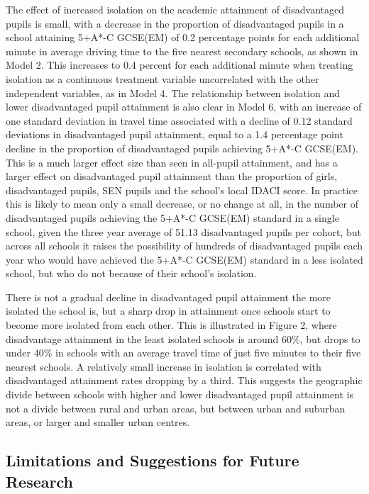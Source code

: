 \documentclass[12pt, a4paper]{article}
\begin{document}
The effect of increased isolation on the academic attainment of disadvantaged pupils is small, with a decrease in the proportion of disadvantaged pupils in a school attaining 5+A*-C GCSE(EM) of 0.2 percentage points for each additional minute in average driving time to the five nearest secondary schools, as shown in Model 2. This increases to 0.4 percent for each additional minute when treating isolation as a continuous treatment variable uncorrelated with the other independent variables, as in Model 4. The relationship between isolation and lower disadvantaged pupil attainment is also clear in Model 6, with an increase of one standard deviation in travel time associated with a decline of 0.12 standard deviations in disadvantaged pupil attainment, equal to a 1.4 percentage point decline in the proportion of disadvantaged pupils achieving 5+A*-C GCSE(EM). This is a much larger effect size than seen in all-pupil attainment, and has a larger effect on disadvantaged pupil attainment than the proportion of girls, disadvantaged pupils, SEN pupils and the school's local IDACI score. In practice this is likely to mean only a small decrease, or no change at all, in the number of disadvantaged pupils achieving the 5+A*-C GCSE(EM) standard in a single school, given the three year average of 51.13 disadvantaged pupils per cohort, but across all schools it raises the possibility of hundreds of disadvantaged pupils each year who would have achieved the 5+A*-C GCSE(EM) standard in a less isolated school, but who do not because of their school's isolation.

There is not a gradual decline in disadvantaged pupil attainment the more isolated the school is, but a sharp drop in attainment once schools start to become more isolated from each other. This is illustrated in Figure 2, where disadvantage attainment in the least isolated schools is around 60\%, but drops to under 40\% in schools with an average travel time of just five minutes to their five nearest schools. A relatively small increase in isolation is correlated with disadvantaged attainment rates dropping by a third. This suggests the geographic divide between schools with higher and lower disadvantaged pupil attainment is not a divide between rural and urban areas, but between urban and suburban areas, or larger and smaller urban centres.

\subsection{Limitations and Suggestions for Future Research}
\end{document}
